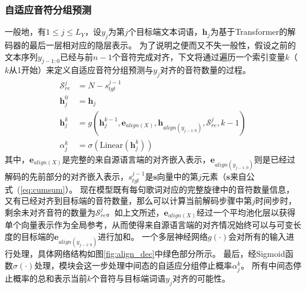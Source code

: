 \subsubsection{自适应音符分组预测}
\label{subsec:act}
一般地，有$1 \leq j \leq L_Y$，设$y_j$为第$j$个目标端文本词语，$\mathbf{h}_j$为基于Transformer的解码器的最后一层相对应的隐层表示。
为了说明之便而又不失一般性，假设之前的文本序列$y_{j-1:0}$已经与前$n-1$个音符完成对齐，下文将通过遍历一个索引变量$k$（$k$从1开始）来定义自适应音符分组预测与$y_j$对齐的音符数量的过程。
\begin{align}
    \mathcal{S}_{re}^j &= N -s^{j-1}_{tgt} \\
     \mathbf{h}_j^0 &= \mathbf{h}_j  \\
     \mathbf{h}_j^k &= g(\mathbf{h}_j^{k-1}, \mathbf{e}_{align(X)}, \mathbf{h}_{align(y_{j-1:0})}, \mathcal{S}_{re}^j, k-1) \\
     \alpha_j^k &= \sigma(\text{Linear}(\mathbf{h}_j^k))
\end{align}
其中，$\mathbf{e}_{align(X)}$是完整的来自源语言端的对齐嵌入表示，$\mathbf{e}_{align(y_{j-1:0})}$则是已经过解码的先前部分的对齐嵌入表示，$s^{j-1}_{tgt}$是$\mathbf{s}$向量中的第$j$元素（$\mathbf{s}$来自公式~(\ref{eq:cumsum}）。
现在模型既有每句歌词对应的完整旋律中的音符数量信息，又有已经对齐到目标端的音符数量，那么可以计算当前解码步骤中第$j$时间步时，剩余未对齐音符的数量为$\mathcal{S}_{re}^j$。如上文所述，$\mathbf{e}_{align(X)}$经过一个平均池化层以获得单个向量表示作为全局参考，从而使得来自源语言端的对齐情况始终可以与可变长度的目标端的$\mathbf{e}_{align(y_{j-1:0})}$进行加和。
一个多层神经网络$g(\cdot)$会对所有的输入进行处理，具体网络结构如图\ref{fig:align_dec}中绿色部分所示。
最后，经Sigmoid函数$\sigma(\cdot)$处理，模块会这一步处理中间态的自适应分组停止概率$\alpha_j^k$。
所有中间态停止概率的总和表示当前$k$个音符与目标端词语$y_j$对齐的可能性。

